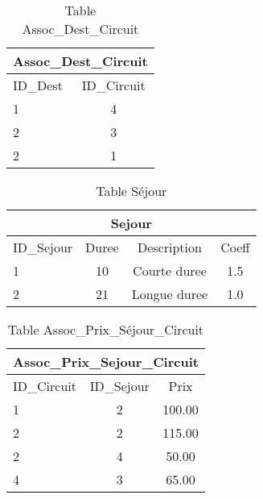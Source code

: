 
\begin{table}[h]
\begin{center}
\begin{tabular}{|l|c|}
\hline
\multicolumn{2}{|c|}{Assoc\_Dest\_Circuit}\\
\hline
ID\_Dest& ID\_Circuit \\
\hline
1 & 4\\
\hline
2 & 3\\
\hline
2 & 1\\
\hline
\end{tabular}
\end{center}
\caption{Table Assoc\_Dest\_Circuit}
\end{table}


\begin{table}[h]
\begin{center}
\begin{tabular}{|l|c|c|c|}
\hline
\multicolumn{4}{|c|}{Sejour}\\
\hline
ID\_Sejour& Duree & Description& Coeff\\
\hline
1 & 10& Courte duree & 1.5\\
\hline
2 & 21& Longue duree &1.0\\
\hline
\end{tabular}
\end{center}
\caption{Table S\'ejour}
\end{table}


\begin{table}[h]
\begin{center}
\begin{tabular}{|l|c|c|}
\hline
\multicolumn{3}{|c|}{Assoc\_Prix\_Sejour\_Circuit}\\
\hline
ID\_Circuit& ID\_Sejour & Prix\\
\hline
1 & 2& 100.00\\
\hline
2 & 2& 115.00\\
\hline
2 & 4& 50.00\\
\hline
4 & 3& 65.00\\
\hline
\end{tabular}
\end{center}
\caption{Table Assoc\_Prix\_S\'ejour\_Circuit}
\end{table}
\newpage

